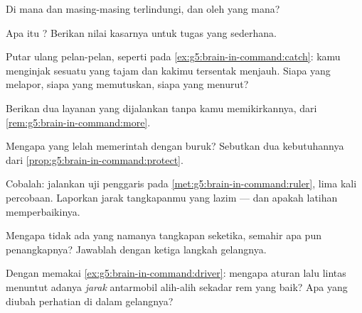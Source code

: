 \begin{exercise}[$\star$]\label{exo:g5:brain-in-command:3}
Di mana  dan  masing-masing terlindungi, dan
oleh  yang mana?
\end{exercise}

\begin{exercise}[$\star$]\label{exo:g5:brain-in-command:4}
Apa itu ? Berikan nilai kasarnya untuk tugas yang
sederhana.
\end{exercise}

\begin{exercise}[$\star$]\label{exo:g5:brain-in-command:5}
Putar ulang pelan-pelan, seperti pada
\cref{ex:g5:brain-in-command:catch}: kamu menginjak sesuatu yang tajam
dan kakimu tersentak menjauh. Siapa yang melapor, siapa yang
memutuskan, siapa yang menurut?
\end{exercise}

\begin{exercise}[$\star$]\label{exo:g5:brain-in-command:6}
Berikan dua layanan yang dijalankan  tanpa kamu memikirkannya,
dari \cref{rem:g5:brain-in-command:more}.
\end{exercise}

\begin{exercise}[$\star$]\label{exo:g5:brain-in-command:7}
Mengapa  yang lelah memerintah dengan buruk? Sebutkan dua
kebutuhannya dari \cref{prop:g5:brain-in-command:protect}.
\end{exercise}

\begin{exercise}[$\star$]\label{exo:g5:brain-in-command:8}
Cobalah: jalankan uji penggaris pada
\cref{met:g5:brain-in-command:ruler}, lima kali percobaan. Laporkan
jarak tangkapanmu yang lazim --- dan apakah latihan memperbaikinya.
\end{exercise}

\begin{exercise}[$\star\star$]\label{exo:g5:brain-in-command:9}
Mengapa tidak ada yang namanya tangkapan seketika, semahir apa pun
penangkapnya? Jawablah dengan ketiga langkah gelangnya.
\end{exercise}

\begin{exercise}[$\star\star$]\label{exo:g5:brain-in-command:10}
Dengan memakai \cref{ex:g5:brain-in-command:driver}: mengapa aturan
lalu lintas menuntut adanya \emph{jarak} antarmobil alih-alih sekadar
rem yang baik? Apa yang diubah perhatian di dalam gelangnya?
\end{exercise}

